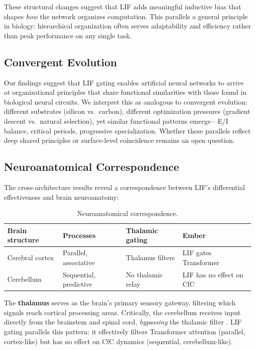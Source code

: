 \documentclass[11pt]{article}
\begin{document}
These structural changes suggest that LIF adds meaningful inductive bias that shapes \emph{how} the network organizes computation. This parallels a general principle in biology: hierarchical organization often serves adaptability and efficiency rather than peak performance on any single task.

\subsection{Convergent Evolution}

Our findings suggest that LIF gating enables artificial neural networks to arrive at organizational principles that share functional similarities with those found in biological neural circuits. We interpret this as analogous to convergent evolution: different substrates (silicon vs.\ carbon), different optimization pressures (gradient descent vs.\ natural selection), yet similar functional patterns emerge---E/I balance, critical periods, progressive specialization. Whether these parallels reflect deep shared principles or surface-level coincidence remains an open question.

\subsection{Neuroanatomical Correspondence}
\label{sec:neuroanatomy}

The cross-architecture results reveal a correspondence between LIF's differential effectiveness and brain neuroanatomy:

\begin{table}[h]
\centering
\caption{Neuroanatomical correspondence.}
\label{tab:neuroanatomy}
\begin{tabular}{llll}
\toprule
\textbf{Brain structure} & \textbf{Processes} & \textbf{Thalamic gating} & \textbf{Ember} \\
\midrule
Cerebral cortex & Parallel, associative & Thalamus filters & LIF gates Transformer \\
Cerebellum & Sequential, predictive & No thalamic relay & LIF has no effect on CfC \\
\bottomrule
\end{tabular}
\end{table}

The \textbf{thalamus} serves as the brain's primary sensory gateway, filtering which signals reach cortical processing areas. Critically, the cerebellum receives input directly from the brainstem and spinal cord, \emph{bypassing} the thalamic filter \cite{schmahmann1997cerebrocerebellar}. LIF gating parallels this pattern: it effectively filters Transformer attention (parallel, cortex-like) but has no effect on CfC dynamics (sequential, cerebellum-like).
\end{document}
